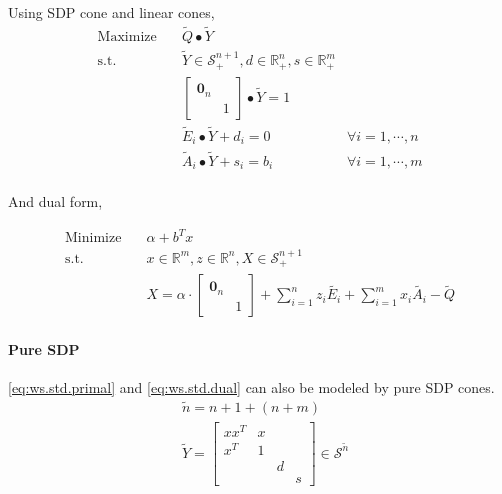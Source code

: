 \documentclass[../main]{subfiles}
\begin{document}
Using SDP cone and linear cones,
\begin{equation} \label{eq:ws.std.primal}
    \begin{aligned}
        \mathrm{Maximize}\quad & \tilde Q \bullet \tilde Y                                                         \\
        \mathrm{s.t.} \quad    & \tilde Y  \in \mathscr S^{n+1}_+, d \in \mathbb{R}^n_+, s
        \in \mathbb{R}^m_+                                                                                         \\
                               & \begin{bmatrix}  \bm 0_n &  \\  & 1  \end{bmatrix} \bullet \tilde Y = 1                                   \\
                               & \tilde E_i \bullet \tilde Y + d_i = 0                     & \forall i=1,\cdots, n \\
                               & \tilde A_i \bullet \tilde Y + s_i = b_i                   & \forall i=1,\cdots, m \\
    \end{aligned}
\end{equation}

And dual form,

\begin{equation} \label{eq:ws.std.dual}
    \begin{aligned}
        \mathrm{Minimize} \quad & \alpha + b^Tx                                                    \\
        \mathrm{s.t.} \quad     & x \in \mathbb{R}^m, z\in \mathbb{R}^n, X  \in \mathscr S^{n+1}_+ \\
                                & X =\alpha \cdot \begin{bmatrix}  \bm 0_n &  \\  & 1  \end{bmatrix}
        + \sum_{i=1}^{n} z_{i} \tilde{E_i}
        + \sum_{i=1}^{m} x_{i} \tilde{A_i}
        - \tilde{Q}
    \end{aligned}
\end{equation}


\paragraph{Pure SDP}
\eqref{eq:ws.std.primal} and \eqref{eq:ws.std.dual} can also be modeled by pure SDP cones.
\begin{equation}
    \begin{aligned}
         & \tilde n = n + 1 + (n + m)                                       \\
         & \tilde{Y} = \begin{bmatrix}
            xx^T & x &   &   \\
            x^T  & 1 &   &   \\
                 &   & d &   \\
                 &   &   & s
        \end{bmatrix}\in \mathscr S^{\tilde{n}}
    \end{aligned}
\end{equation}
\end{document}
